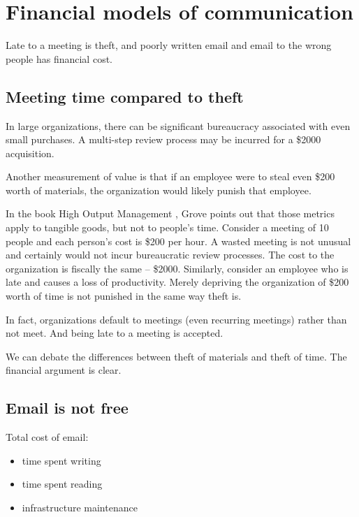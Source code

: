 \section{Financial models of communication}

Late to a meeting is theft, and poorly written email and email to the wrong people has financial cost.

\subsection*{Meeting time compared to theft}

In large organizations, there can be significant bureaucracy associated with even small purchases. A multi-step review process may be incurred for a \$2000 acquisition.

Another measurement of value is that if an employee were to steal even \$200 worth of materials, the organization would likely punish that employee.


In the book High Output Management \cite{1995_Grove}, Grove points out that those metrics apply to tangible goods, but not to people's time. Consider a meeting of 10 people and each person's cost is \$200 per hour. 
A wasted meeting is not unusual and certainly would not incur bureaucratic review processes. The cost to the organization is fiscally the same -- \$2000. Similarly, consider an employee who is late and causes a loss of productivity. Merely depriving the organization of \$200 worth of time is not punished in the same way theft is.

In fact, organizations default to meetings (even recurring meetings) rather than not meet. And being late to a meeting is accepted. 

We can debate the differences between theft of materials and theft of time. The financial argument is clear. 


\subsection*{Email is not free}

Total cost of email:
\begin{itemize}
    \item time spent writing
    \item time spent reading
    \item infrastructure maintenance
\end{itemize}

